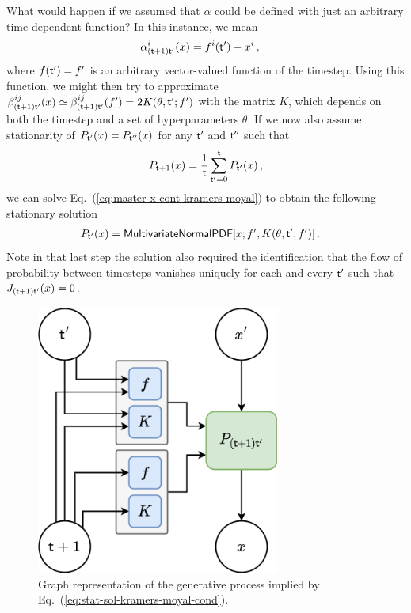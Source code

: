 What would happen if we assumed that $\alpha$ could be defined with just an arbitrary time-dependent function? In this instance, we mean
\begin{align}
\alpha^i_{({\sf t}+1){\sf t}'}(x) &= f^i({\sf t}')-x^i \,,
\end{align}
where $f({\sf t}')=f'$ is an arbitrary vector-valued function of the timestep. Using this function, we might then try to approximate $\beta^{ij}_{({\sf t}+1){\sf t}'}(x) \simeq \beta^{ij}_{({\sf t}+1){\sf t}'}(f') = 2K(\theta , {\sf t}' ; f')$ with the matrix $K$, which depends on both the timestep and a set of hyperparameters $\theta$. If we now also assume stationarity of $P_{{\sf t}'}(x)=P_{{\sf t}''}(x)$ for any ${\sf t}'$ and ${\sf t}''$ such that
\begin{align}
P_{{\sf t}+1}(x) = \frac{1}{{\sf t}}\sum_{{\sf t}'=0}^{{\sf t}} P_{{\sf t}'}(x) \,,
\end{align}
we can solve Eq.~(\ref{eq:master-x-cont-kramers-moyal}) to obtain the following stationary solution
\begin{align}
P_{{\sf t}'}(x) &= {\sf MultivariateNormalPDF}[x;f',K(\theta , {\sf t}' ; f')]\label{eq:stat-sol-kramers-moyal}\,.
\end{align}
Note in that last step the solution also required the identification that the flow of probability between timesteps vanishes uniquely for each and every ${\sf t}'$ such that $J_{({\sf t}+1){\sf t}'}(x)=0$. 

\begin{figure}[h]
\centering
\includegraphics[width=8cm]{images/gp-like-diag.drawio.png}
\caption{Graph representation of the generative process implied by Eq.~(\ref{eq:stat-sol-kramers-moyal-cond}).}
\label{fig:stat-sol-kramers-moyal-cond}
\end{figure}

